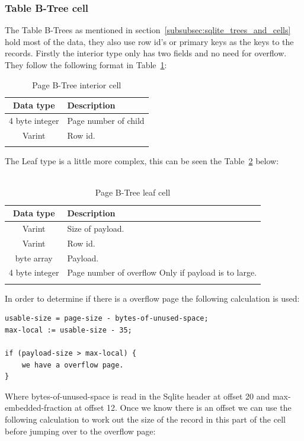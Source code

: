 \subsubsection{Table B-Tree cell}
\label{subsubsec:table_btree_cell}

The Table B-Trees as mentioned in section~\ref{subsubsec:sqlite_trees_and_cells} hold most of the data, they also use row id's or primary keys as the keys to the records. Firstly the interior type only has two fields and no need for overflow. They follow the following format in Table~\ref{tbl:table_btree_cell_interior}: 

\begin{longtable}[h]{| c | p{5cm} |}
		\hline
			\textbf{Data type} & \textbf{Description} \\ 
		\hline
		\endhead
			4 byte integer & Page number of child \\
		\hline
			Varint & Row id. \\
		\hline
	\caption{Page B-Tree interior cell}
	\label{tbl:table_btree_cell_interior}
\end{longtable}

The Leaf type is a little more complex, this can be seen the Table~\ref{tbl:table_btree_cell_leaf} below:
\\\\
\begin{longtable}[h]{| c | p{5cm} |}
		\hline
			\textbf{Data type} & \textbf{Description} \\ 
		\hline
		\endhead
			Varint & Size of payload. \\
		\hline
			Varint & Row id. \\
		\hline
			byte array & Payload. \\
		\hline
			4 byte integer & Page number of overflow \newline
							  Only if payload is to large.\\
		\hline
	\caption{Page B-Tree leaf cell}
	\label{tbl:table_btree_cell_leaf}
\end{longtable}

In order to determine if there is a overflow page the following calculation is used:

\begin{lstlisting}	
usable-size = page-size - bytes-of-unused-space;
max-local := usable-size - 35;

if (payload-size > max-local) {
	we have a overflow page.
}
\end{lstlisting}

Where bytes-of-unused-space is read in the Sqlite header at offset 20 and \newline max-embedded-fraction at offset 12. Once we know there is an offset we can use the following calculation to work out the size of the record in this part of the cell before jumping over to the overflow page:  

